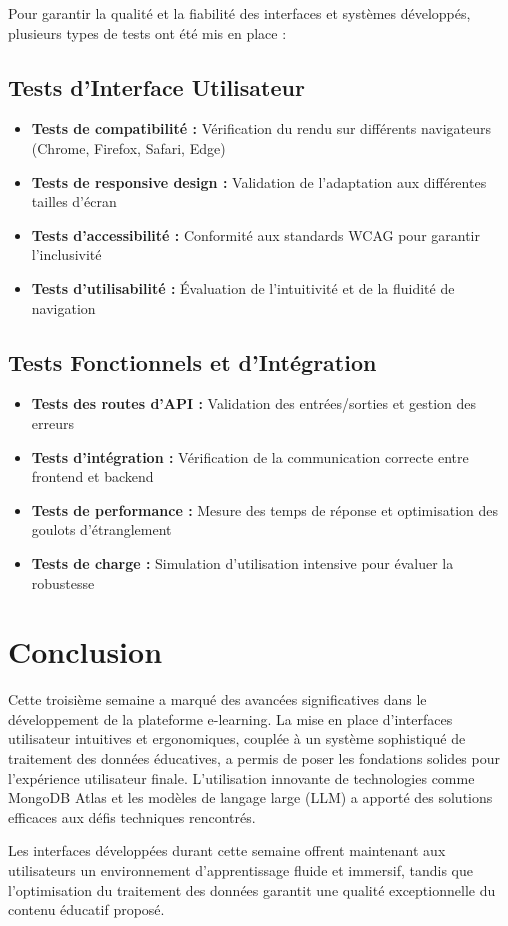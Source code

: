 Pour garantir la qualité et la fiabilité des interfaces et systèmes développés, plusieurs types de tests ont été mis en place :

\subsection{Tests d'Interface Utilisateur}

\begin{itemize}
  \item \textbf{Tests de compatibilité :} Vérification du rendu sur différents navigateurs (Chrome, Firefox, Safari, Edge)
  \item \textbf{Tests de responsive design :} Validation de l'adaptation aux différentes tailles d'écran
  \item \textbf{Tests d'accessibilité :} Conformité aux standards WCAG pour garantir l'inclusivité
  \item \textbf{Tests d'utilisabilité :} Évaluation de l'intuitivité et de la fluidité de navigation
\end{itemize}

\subsection{Tests Fonctionnels et d'Intégration}

\begin{itemize}
  \item \textbf{Tests des routes d'API :} Validation des entrées/sorties et gestion des erreurs
  \item \textbf{Tests d'intégration :} Vérification de la communication correcte entre frontend et backend
  \item \textbf{Tests de performance :} Mesure des temps de réponse et optimisation des goulots d'étranglement
  \item \textbf{Tests de charge :} Simulation d'utilisation intensive pour évaluer la robustesse
\end{itemize}

\section{Conclusion}

Cette troisième semaine a marqué des avancées significatives dans le développement de la plateforme e-learning. La mise en place d'interfaces utilisateur intuitives et ergonomiques, couplée à un système sophistiqué de traitement des données éducatives, a permis de poser les fondations solides pour l'expérience utilisateur finale. L'utilisation innovante de technologies comme MongoDB Atlas et les modèles de langage large (LLM) a apporté des solutions efficaces aux défis techniques rencontrés.

Les interfaces développées durant cette semaine offrent maintenant aux utilisateurs un environnement d'apprentissage fluide et immersif, tandis que l'optimisation du traitement des données garantit une qualité exceptionnelle du contenu éducatif proposé. 